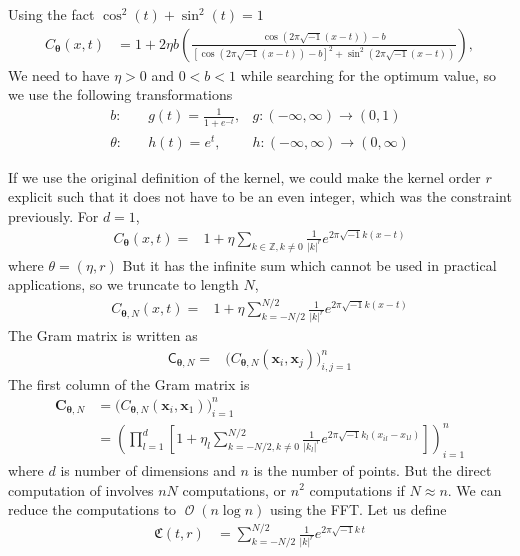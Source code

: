 \documentclass{iitthesis}          %
\DeclareMathOperator{\Order}{{\mathcal O}}
\newcommand{\bm}[1]{\boldsymbol{#1}}
\newcommand{\vtheta}{{\bm{\theta}}}
\newcommand{\vC}{\bm{C}}
\newcommand{\vx}{\bm{x}}
\newcommand{\mC}{\mathsf{C}}
\def\abs#1{\ensuremath{\left \lvert #1 \right \rvert}}
\begin{document}
Using the fact $\cos^2(t) + \sin^2(t) = 1$
\begin{align*}
C_\vtheta(x, t) &= 
1 + 2 \eta b
\left(
\frac{ \cos({2 \pi\sqrt{-1} (x-t) }) - b }
{ \left[\cos({ 2 \pi\sqrt{-1} (x-t)})-b\right]^2 + \sin^2({ 2 \pi\sqrt{-1} (x-t)}) }
\right),
\end{align*}
We need to have $\eta > 0$ and $ 0 < b < 1$ while searching for the optimum value, so we use the following transformations
\begin{align*}
b: & \quad g(t) = \frac{1}{1 + e^{-t}}, & g:(-\infty, \infty) \to (0, 1)
\\
\theta: & \quad h(t) = e^{t}, & h:(-\infty, \infty) \to (0, \infty)
\end{align*}


If we use the original definition of the kernel, we could make the kernel order $r$ explicit such that it does not have to be an even integer, which was the constraint previously. For $d=1$,
\begin{align*}
C_\vtheta(x, t) = & 1 + \eta \sum_{k \in \mathbb{Z}, k \neq 0 } \frac{1}{\abs{k}^r} 
e^{ 2 \pi\sqrt{-1} k (x-t)}
\end{align*}
where $\theta = (\eta, r)$
But it has the infinite sum which cannot be used in practical applications, so we truncate to length $N$,
\begin{align*}
C_{\vtheta, N}(x, t) = & 1 + \eta \sum_{k = - N/2 }^{N/2} \frac{1}{\abs{k}^r} 
e^{ 2 \pi\sqrt{-1} k (x-t)}
\end{align*}
The Gram matrix is written as 
\begin{align*}
\mC_{\vtheta, N} = & \biggl( C_{\vtheta, N}(\vx_i, \vx_j) \biggr)_{i,j=1}^n
\end{align*}
The first column of the Gram matrix is
\begin{align*}
\vC_{\vtheta, N} &= \biggl( C_{\vtheta, N}(\vx_i, \vx_1) \biggr)_{i=1}^n
\\
&= \left( \prod_{l=1}^d \left[ 1 + \eta_l \sum_{k = - N/2, k \neq 0 }^{N/2} \frac{1}{\abs{k_l}^r} 
e^{ 2 \pi\sqrt{-1} k_l (x_{il}-x_{1l})}\right] \right)_{i=1}^n
\end{align*}
where $d$ is number of dimensions and $n$ is the number of points. 
But the direct computation of involves $nN$ computations, or $n^2$ computations if $N \approx n$. We can reduce the computations to $\Order(n\log n)$ using the FFT.
Let us define
\begin{align*}
\mathfrak{C}(t, r) &= \sum_{k = - N/2 }^{N/2} \frac{1}{\abs{k}^r} 
e^{ 2 \pi\sqrt{-1} k\, t}
\end{align*}
\end{document}
